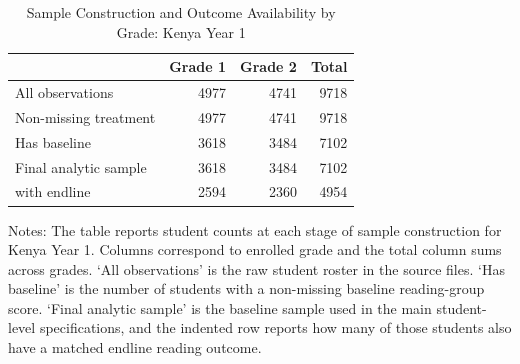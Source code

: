 \begin{table}[htbp]
\caption{Sample Construction and Outcome Availability by Grade: Kenya Year 1}
\label{tab:ke_sampleflow}
\begin{center}
\begin{small}
\begin{threeparttable}
\begin{tabular}{l*{3}{r}}
\toprule
 & Grade 1 & Grade 2 & Total \\
\midrule
All observations & 4977 & 4741 & 9718 \\
Non-missing treatment & 4977 & 4741 & 9718 \\
Has baseline & 3618 & 3484 & 7102 \\
Final analytic sample & 3618 & 3484 & 7102 \\
\quad with endline & 2594 & 2360 & 4954 \\
\bottomrule
\end{tabular}
\begin{tablenotes}
\footnotesize \item Notes: The table reports student counts at each stage of sample construction for Kenya Year 1. Columns correspond to enrolled grade and the total column sums across grades. `All observations' is the raw student roster in the source files. `Has baseline' is the number of students with a non-missing baseline reading-group score. `Final analytic sample' is the baseline sample used in the main student-level specifications, and the indented row reports how many of those students also have a matched endline reading outcome.
\end{tablenotes}
\end{threeparttable}
\end{small}
\end{center}
\end{table}